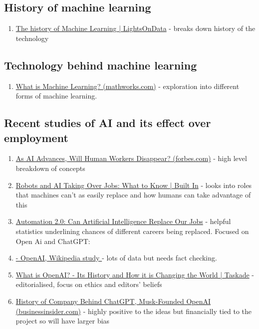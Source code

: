 \subsection{History of machine learning}
\begin{enumerate}
    \item \href{https://www.lightsondata.com/the-history-of-machine-learning/}{The history of Machine Learning | LightsOnData} - breaks down history of the technology
\end{enumerate}
\subsection{Technology behind machine learning}
\begin{enumerate}
    \item \href{https://www.mathworks.com/discovery/machine-learning.html}{What is Machine Learning? (mathworks.com)} - exploration into different forms of machine learning.

\end{enumerate}
\subsection{Recent studies of AI and its effect over employment}
\begin{enumerate}
    \item \href{https://www.forbes.com/sites/forbestechcouncil/2022/06/28/as-ai-advances-will-human-workers-disappear/#:~:text=In%20its%20recent%20Future%20of,same%20timeframe%20due%20to%20AI.}{As AI Advances, Will Human Workers Disappear? (forbes.com)} - high level breakdown of concepts
    \item \href{https://builtin.com/artificial-intelligence/ai-replacing-jobs-creating-jobs}{Robots and AI Taking Over Jobs: What to Know | Built In} - looks into roles that machines can't as easily replace and how humans can take advantage of this
    \item \href{https://www.lumeer.io/automation-replace-manual-jobs/}{Automation 2.0: Can Artificial Intelligence Replace Our Jobs} - helpful statistics underlining chances of different careers being replaced.
          Focused on Open Ai and ChatGPT:
    \item \href{https://en.wikipedia.org/wiki/OpenAI#:~:text=OpenAI%20conducts%20AI%20research%20to,collectively%20pledged%20US%241%20billion.}{- OpenAI, Wikipedia study } - lots of data but needs fact checking.
    \item \href{https://www.taskade.com/blog/openai-chatgpt-history/}{What is OpenAI? - Its History and How it is Changing the World | Taskade} - editorialised, focus on ethics and editors' beliefs
    \item \href{https://www.businessinsider.com/history-of-openai-company-chatgpt-elon-musk-founded-2022-12?r=US&IR=T}{History of Company Behind ChatGPT, Musk-Founded OpenAI (businessinsider.com)} - highly positive to the ideas but financially tied to the project so will have larger bias
\end{enumerate}